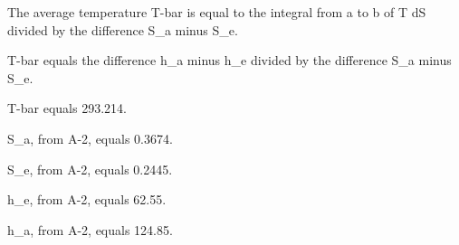 The average temperature T-bar is equal to the integral from a to b of T dS divided by the difference S_a minus S_e.

T-bar equals the difference h_a minus h_e divided by the difference S_a minus S_e.

T-bar equals 293.214.

S_a, from A-2, equals 0.3674.

S_e, from A-2, equals 0.2445.

h_e, from A-2, equals 62.55.

h_a, from A-2, equals 124.85.